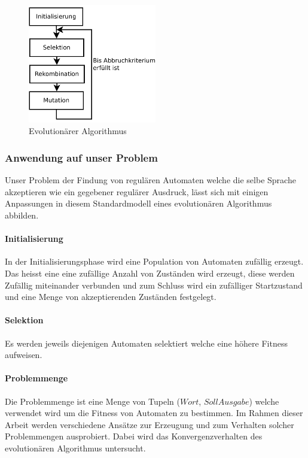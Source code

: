 \begin{figure}[h]
  \centering
  \includegraphics[width=0.5\textwidth]{images/evolutionaerer_algorithmus.pdf}
  \caption[Evolutionärer Algorithmus]{Evolutionärer Algorithmus \cite{droste}}
  \label{fig:evolutionary_algorithm}
\end{figure}

\subsubsection{Anwendung auf unser Problem}
Unser Problem der Findung von regulären Automaten welche die selbe Sprache akzeptieren wie ein gegebener regulärer Ausdruck, lässt sich mit einigen Anpassungen in diesem Standardmodell eines evolutionären Algorithmus abbilden.

\paragraph{Initialisierung}
In der Initialisierungsphase wird eine Population von Automaten zufällig erzeugt. Das heisst eine eine zufällige Anzahl von Zuständen wird erzeugt, diese werden Zufällig miteinander verbunden und zum Schluss wird ein zufälliger Startzustand und eine Menge von akzeptierenden Zuständen festgelegt.

\paragraph{Selektion}
Es werden jeweils diejenigen Automaten selektiert welche eine höhere Fitness aufweisen.

\paragraph{Problemmenge}
Die Problemmenge ist eine Menge von Tupeln ($Wort$, $Soll Ausgabe$) welche verwendet wird um die Fitness von Automaten zu bestimmen. Im Rahmen dieser Arbeit werden verschiedene Ansätze zur Erzeugung und zum Verhalten solcher Problemmengen ausprobiert. Dabei wird das Konvergenzverhalten des evolutionären Algorithmus untersucht.

